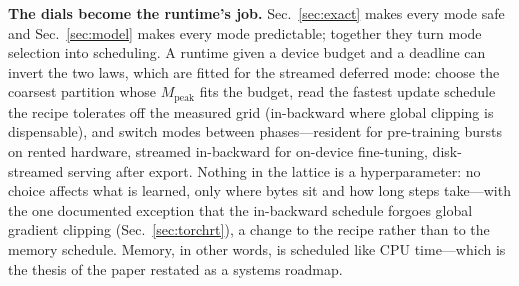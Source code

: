 \documentclass[journal]{IEEEtran}
\begin{document}
\textbf{The dials become the runtime's job.} Sec.~\ref{sec:exact} makes
every mode safe and Sec.~\ref{sec:model} makes every mode predictable;
together they turn mode selection into scheduling. A runtime given a
device budget and a deadline can invert the two laws, which are fitted for the
streamed deferred mode: choose the coarsest partition whose $M_\text{peak}$
fits the budget, read the fastest update schedule the recipe tolerates off the
measured grid (in-backward where global clipping is dispensable), and
switch modes between phases---resident for pre-training bursts on rented
hardware, streamed in-backward for on-device fine-tuning, disk-streamed
serving after export. Nothing in the lattice is a hyperparameter: no choice affects what is
learned, only where bytes sit and how long steps take---with the one
documented exception that the in-backward schedule forgoes global
gradient clipping (Sec.~\ref{sec:torchrt}), a change to the recipe rather
than to the memory schedule. Memory, in other words, is scheduled like CPU time---which is the
thesis of the paper restated as a systems roadmap.

\end{document}
